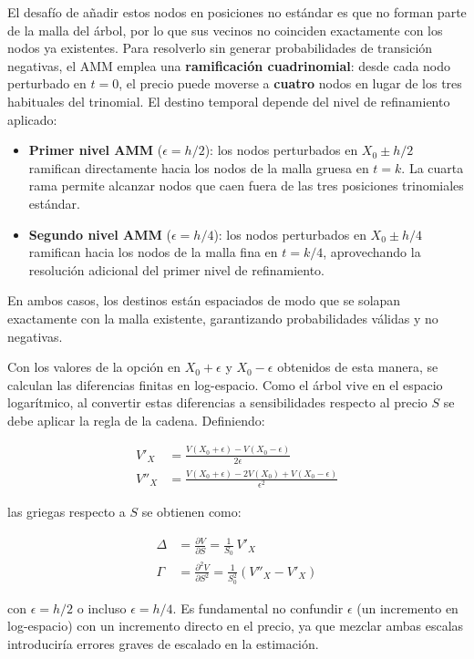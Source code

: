El desafío de añadir estos nodos en posiciones no estándar es que no forman parte de la malla del árbol, por lo que sus vecinos no coinciden exactamente con los nodos ya existentes. Para resolverlo sin generar probabilidades de transición negativas, el AMM emplea una \textbf{ramificación cuadrinomial}: desde cada nodo perturbado en $t=0$, el precio puede moverse a \textbf{cuatro} nodos en lugar de los tres habituales del trinomial. El destino temporal depende del nivel de refinamiento aplicado:

\begin{itemize}
    \item \textbf{Primer nivel AMM} ($\epsilon = h/2$): los nodos perturbados en $X_0 \pm h/2$ ramifican directamente hacia los nodos de la malla gruesa en $t = k$. La cuarta rama permite alcanzar nodos que caen fuera de las tres posiciones trinomiales estándar.
    \item \textbf{Segundo nivel AMM} ($\epsilon = h/4$): los nodos perturbados en $X_0 \pm h/4$ ramifican hacia los nodos de la malla fina en $t = k/4$, aprovechando la resolución adicional del primer nivel de refinamiento.
\end{itemize}

En ambos casos, los destinos están espaciados de modo que se solapan exactamente con la malla existente, garantizando probabilidades válidas y no negativas.

Con los valores de la opción en $X_0 + \epsilon$ y $X_0 - \epsilon$ obtenidos de esta manera, se calculan las diferencias finitas en log-espacio. Como el árbol vive en el espacio logarítmico, al convertir estas diferencias a sensibilidades respecto al precio $S$ se debe aplicar la regla de la cadena. Definiendo:

\begin{align}
V'_X &= \frac{V(X_0 + \epsilon) - V(X_0 - \epsilon)}{2\epsilon} \\
V''_X &= \frac{V(X_0 + \epsilon) - 2V(X_0) + V(X_0 - \epsilon)}{\epsilon^2}
\end{align}

las griegas respecto a $S$ se obtienen como:

\begin{align}
\Delta &= \frac{\partial V}{\partial S} = \frac{1}{S_0} \, V'_X \\
\Gamma &= \frac{\partial^2 V}{\partial S^2} = \frac{1}{S_0^2}\left(V''_X - V'_X\right)
\end{align}

con $\epsilon = h/2$ o incluso $\epsilon = h/4$. Es fundamental no confundir $\epsilon$ (un incremento en log-espacio) con un incremento directo en el precio, ya que mezclar ambas escalas introduciría errores graves de escalado en la estimación.

